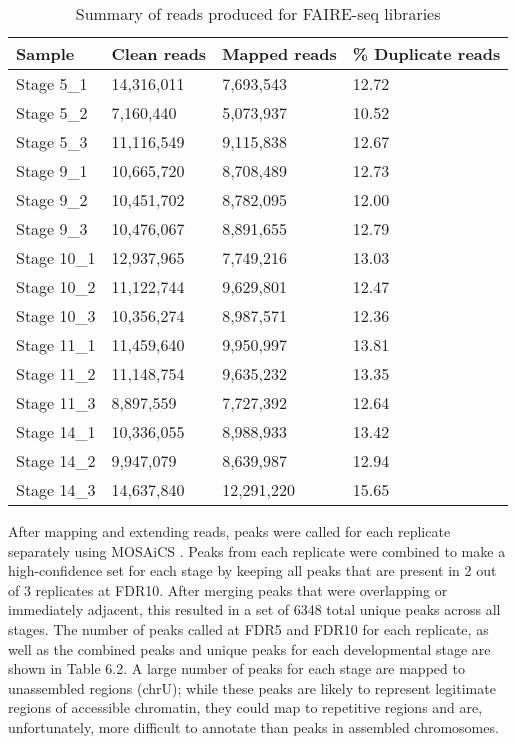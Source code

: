 \begin{table}[h]
\centering
\begin{tabular}{|l|l|l|l|}
\hline
\textbf{Sample}      & \textbf{Clean reads} & \textbf{Mapped reads} & \textbf{\% Duplicate reads} \\ \hline
Stage 5\_1  & 14,316,011    & 7,693,543      & 12.72              \\ \hline
Stage 5\_2  & 7,160,440     & 5,073,937      & 10.52              \\ \hline
Stage 5\_3  & 11,116,549    & 9,115,838      & 12.67              \\ \hline
Stage 9\_1  & 10,665,720    & 8,708,489      & 12.73              \\ \hline
Stage 9\_2  & 10,451,702    & 8,782,095      & 12.00               \\ \hline
Stage 9\_3  & 10,476,067    & 8,891,655      & 12.79              \\ \hline
Stage 10\_1 & 12,937,965    & 7,749,216      & 13.03              \\ \hline
Stage 10\_2 & 11,122,744    & 9,629,801      & 12.47              \\ \hline
Stage 10\_3 & 10,356,274    & 8,987,571      & 12.36              \\ \hline
Stage 11\_1 & 11,459,640    & 9,950,997      & 13.81              \\ \hline
Stage 11\_2 & 11,148,754    & 9,635,232      & 13.35              \\ \hline
Stage 11\_3 & 8,897,559     & 7,727,392      & 12.64              \\ \hline
Stage 14\_1 & 10,336,055    & 8,988,933      & 13.42              \\ \hline
Stage 14\_2 & 9,947,079     & 8,639,987      & 12.94              \\ \hline
Stage 14\_3 & 14,637,840    & 12,291,220     & 15.65              \\  \hline
\end{tabular}
\caption{Summary of reads produced for FAIRE-seq libraries}
\label{Table 6.1}
\end{table}

After mapping and extending reads, peaks were called for each replicate separately using MOSAiCS \citep{mosaics}. Peaks from each replicate were combined to make a high-confidence set for each stage by keeping all peaks that are present in 2 out of 3 replicates at FDR10. After merging peaks that were overlapping or immediately adjacent, this resulted in a set of 6348 total unique peaks across all stages. The number of peaks called at FDR5 and FDR10 for each replicate, as well as the combined peaks and unique peaks for each developmental stage are shown in Table 6.2. A large number of peaks for each stage are mapped to unassembled regions (chrU); while these peaks are likely to represent legitimate regions of accessible chromatin, they could map to repetitive regions and are, unfortunately, more difficult to annotate than peaks in assembled chromosomes.\\

